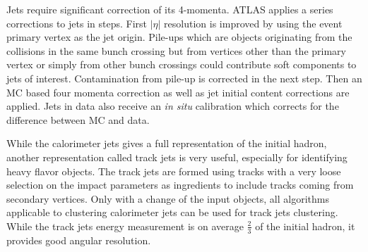 Jets require significant correction of its 4-momenta. ATLAS applies a series corrections\cite{PERF-2016-04} to jets in steps. First $|\eta|$ resolution is improved by using the event primary vertex as the jet origin. Pile-ups which are objects originating from the collisions in the same bunch crossing but from vertices other than the primary vertex or simply from other bunch crossings could contribute soft components to jets of interest. Contamination from pile-up is corrected in the next step. Then an MC based four momenta correction as well as jet initial content corrections are applied. Jets in data also receive an \textit{in situ} calibration which corrects for the difference between MC and data.

While the calorimeter jets gives a full representation of the initial hadron, another representation called track jets is very useful, especially for identifying heavy flavor objects. The track jets are formed using tracks with a very loose selection on the impact parameters as ingredients to include tracks coming from secondary vertices. Only with a change of the input objects, all algorithms applicable to clustering calorimeter jets can be used for track jets clustering. While the track jets energy measurement is on average $\frac{2}{3}$ of the initial hadron, it provides good angular resolution. 
